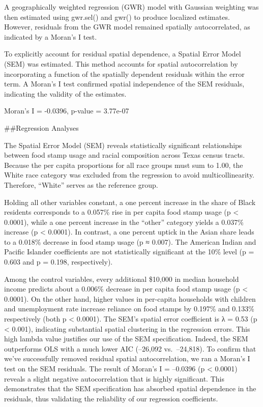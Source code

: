 \documentclass[
]{article}
\begin{document}
A geographically weighted regression (GWR) model with Gaussian weighting
was then estimated using gwr.sel() and gwr() to produce localized
estimates. However, residuals from the GWR model remained spatially
autocorrelated, as indicated by a Moran's I test.

To explicitly account for residual spatial dependence, a Spatial Error
Model (SEM) was estimated. This method accounts for spatial
autocorrelation by incorporating a function of the spatially dependent
residuals within the error term. A Moran's I test confirmed spatial
independence of the SEM residuals, indicating the validity of the
estimates.

Moran's I = -0.0396, p-value = 3.77e-07

\#\#Regression Analyses

The Spatial Error Model (SEM) reveals statistically significant
relationships between food stamp usage and racial composition across
Texas census tracts. Because the per capita proportions for all race
groups must sum to 1.00, the White race category was excluded from the
regression to avoid multicollinearity. Therefore, ``White'' serves as
the reference group.

Holding all other variables constant, a one percent increase in the
share of Black residents corresponds to a 0.057\% rise in per capita
food stamp usage (p \textless{} 0.0001), while a one percent increase in
the ``other'' category yields a 0.037\% increase (p \textless{} 0.0001).
In contrast, a one percent uptick in the Asian share leads to a 0.018\%
decrease in food stamp usage (p ≈ 0.007). The American Indian and
Pacific Islander coefficients are not statistically significant at the
10\% level (p = 0.603 and p = 0.198, respectively).

Among the control variables, every additional \$10,000 in median
household income predicts about a 0.006\% decrease in per capita food
stamp usage (p \textless{} 0.0001). On the other hand, higher values in
per-capita households with children and unemployment rate increase
reliance on food stamps by 0.197\% and 0.133\% respectively (both p
\textless{} 0.0001). The SEM's spatial error coefficient is λ = 0.53 (p
\textless{} 0.001), indicating substantial spatial clustering in the
regression errors. This high lambda value justifies our use of the SEM
specification. Indeed, the SEM outperforms OLS with a much lower AIC
(--26,092 vs.~--24,818). To confirm that we've successfully removed
residual spatial autocorrelation, we ran a Moran's I test on the SEM
residuals. The result of Moran's I = --0.0396 (p \textless{} 0.0001)
reveals a slight negative autocorrelation that is highly significant.
This demonstrates that the SEM specification has absorbed spatial
dependence in the residuals, thus validating the reliability of our
regression coefficients.
\end{document}
